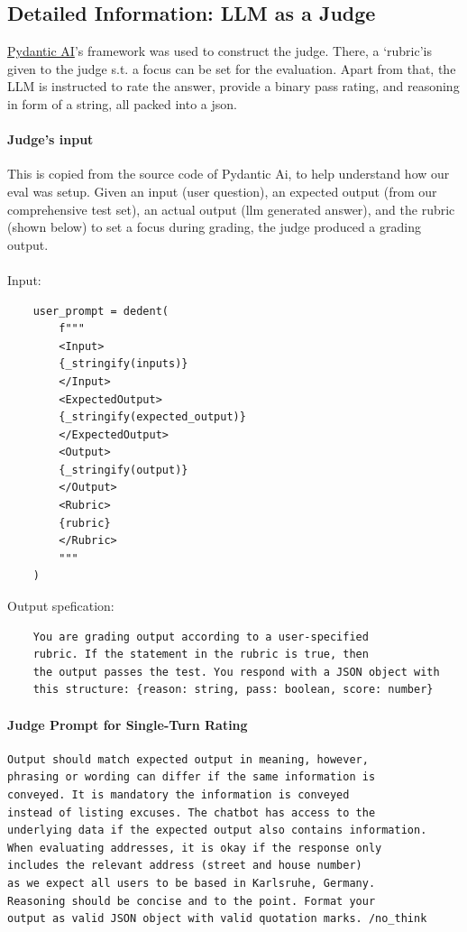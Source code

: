\documentclass{article}
\begin{document}
\subsection{Detailed Information: LLM as a Judge}\label{subsec:llm-judge}

\href{https://ai.pydantic.dev/evals/#evaluation-with-llmjudge}{Pydantic AI}'s framework was used to construct the judge. There, a `rubric'is given to the judge s.t. a focus can be set for the evaluation. Apart from that, the LLM is instructed to rate the answer, provide a binary pass rating, and reasoning in form of a string, all packed into a json.

\paragraph{Judge's input}
This is copied from the source code of Pydantic Ai, to help understand how our eval was setup. Given an input (user question), an expected output (from our comprehensive test set), an actual output (llm generated answer), and the rubric (shown below) to set a focus during grading, the judge produced a grading output.
\\
\\
Input:
\begin{verbatim}
    user_prompt = dedent(
        f"""
        <Input>
        {_stringify(inputs)}
        </Input>
        <ExpectedOutput>
        {_stringify(expected_output)}
        </ExpectedOutput>
        <Output>
        {_stringify(output)}
        </Output>
        <Rubric>
        {rubric}
        </Rubric>
        """
    )
\end{verbatim}

Output spefication:
\begin{verbatim}
    You are grading output according to a user-specified
    rubric. If the statement in the rubric is true, then
    the output passes the test. You respond with a JSON object with
    this structure: {reason: string, pass: boolean, score: number}
\end{verbatim}


\paragraph{Judge Prompt for Single-Turn Rating}
\begin{verbatim}
Output should match expected output in meaning, however,
phrasing or wording can differ if the same information is
conveyed. It is mandatory the information is conveyed
instead of listing excuses. The chatbot has access to the
underlying data if the expected output also contains information.
When evaluating addresses, it is okay if the response only
includes the relevant address (street and house number)
as we expect all users to be based in Karlsruhe, Germany.
Reasoning should be concise and to the point. Format your
output as valid JSON object with valid quotation marks. /no_think
\end{verbatim}
\end{document}
